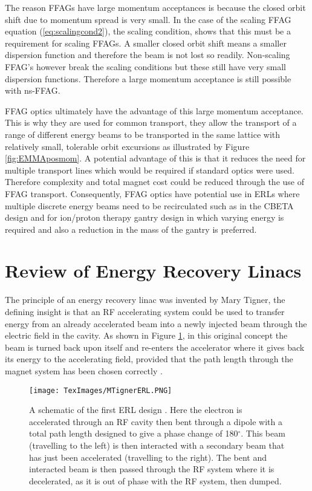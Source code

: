 \documentclass[11pt]{article}
\begin{document}
The reason FFAGs have large momentum acceptances is because the closed orbit shift due to momentum spread is very small. In the case of the scaling FFAG equation (\ref{eq:scalingcond2}), the scaling condition, shows that this must be a requirement for scaling FFAGs. A smaller closed orbit shift means a smaller dispersion function and therefore the beam is not lost so readily.
Non-scaling FFAG's however break the scaling conditions but these still have very small dispersion functions. Therefore a large momentum acceptance is still possible with ns-FFAG. 

FFAG optics ultimately have the advantage of this large momentum acceptance. This is why they are used for common transport, they allow the transport of a range of different energy beams to be transported in the same lattice with relatively small, tolerable orbit excursions as illustrated by Figure \ref{fig:EMMAposmom}. A potential advantage of this is that it reduces the need for multiple transport lines which would be required if standard optics were used. Therefore complexity and total magnet cost could be reduced through the use of FFAG transport. Consequently, FFAG optics have potential use in ERLs where multiple discrete energy beams need to be recirculated such as in the CBETA design \cite{CBETATDR} and for ion/proton therapy gantry design \cite{DejanGantry} in which varying energy is required and also a reduction in the mass of the gantry is preferred.     

\section{Review of Energy Recovery Linacs}
\label{sec:ERLreview}

The principle of an energy recovery linac was invented by Mary Tigner, the defining insight is that an RF accelerating system could be used to transfer energy from an already accelerated beam into a newly injected beam through the electric field in the cavity. As shown in Figure \ref{fig:MTignerERL}, in this original concept the beam is turned back upon itself and re-enters the accelerator where it gives back its energy to the accelerating field, provided that the path length through the magnet system has been chosen correctly \cite{MTignerERL}.

\begin{figure}[H]
\centering
\texttt{[image: TexImages/MTignerERL.PNG]}
\caption{\label{fig:MTignerERL} A schematic of the first ERL design \cite{MTignerERL}. Here the electron is accelerated through an RF cavity then bent through a dipole with a total path length designed to give a phase change of 180$^{\circ}$. This beam (travelling to the left) is then interacted with a secondary beam that has just been accelerated (travelling to the right). The bent and interacted beam is then passed through the RF system where it is decelerated, as it is out of phase with the RF system, then dumped.}
\end{figure}
\end{document}
